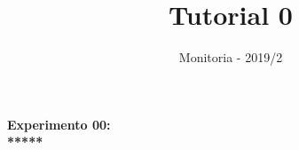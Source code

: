 \documentclass[10pt]{article}
\author{Monitoria - 2019/2}
\title{Tutorial 0}
\numberwithin{table}{section}
\begin{document}
\begin{center}
\vspace*{.03cm}
\Large\bfseries{Experimento 00:}\\ %
\Large{*****}
\end{center}
\justify
\end{document}
